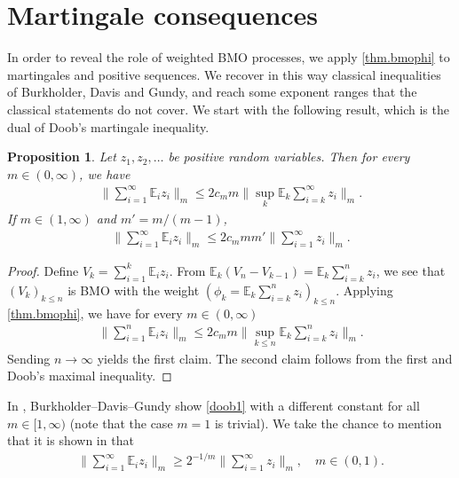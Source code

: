 \documentclass[12pt,oneside,reqno,fleqn]{amsart}
\numberwithin{equation}{section}
\newtheorem{proposition}[theorem]{Proposition}
\theoremstyle{remark}
\newcommand\mE{{\mathbb E}}
\newcommand\E{\mE}
\newcommand{\1}{{\mathbf 1}}
\renewcommand{\le}{\leq}
\renewcommand{\ge}{\geq}
\begin{document}
\section{Martingale consequences} %
\label{sec:inequalities_for_martingales}	
	In order to reveal the role of weighted BMO processes, we apply \cref{thm.bmophi} to martingales and positive sequences.
	We recover in this way classical inequalities of Burkholder, Davis and Gundy, and reach some exponent ranges that the classical statements do not cover.
	We start with the following result, which is the dual of Doob's martingale inequality.
	\begin{proposition}
		Let $z_1,z_2,\ldots$ be positive random variables. Then for every $m\in(0,\infty)$, we have
		\begin{align}\label{doob0}
			\|\sum_{i=1}^\infty\E_{i}z_i\|_m\le 2c_mm\|\sup_{k}\E_k\sum_{i=k}^\infty z_i\|_m.
		\end{align}
		If $m\in(1,\infty)$ and $m'=m/(m-1)$,
		\begin{align}\label{doob1}
			\|\sum_{i=1}^\infty\E_{i}z_i\|_m\le 2c_mmm'\|\sum_{i=1}^\infty z_i\|_m.
		\end{align}
	\end{proposition}
	\begin{proof} 
		Define $V_k=\sum_{i=1}^k\E_{i}z_i$. From $\E_{k}(V_n-V_{k-1})=\E_{k}\sum_{i=k}^nz_i$,
		we see that $(V_k)_{k\le n}$ is BMO with the weight $(\phi_k=\E_k\sum_{i=k}^n z_i)_{k\le n}$. Applying \cref{thm.bmophi}, we have for every $m\in(0,\infty)$
		\begin{align*}
			\|\sum_{i=1}^n\E_{i}z_i\|_m\le 2c_mm\|\sup_{k\le n}\E_k\sum_{i=k}^n z_i\|_m.
		\end{align*}
		Sending $n\to\infty$ yields the first claim. The second claim follows from the first and Doob's maximal inequality.	
	\end{proof}
	In \cite{MR0400380}, Burkholder--Davis--Gundy  show \eqref{doob1}  with a different constant for all $m\in[1,\infty)$ (note that the case $m=1$ is trivial). We take the chance to mention that it is shown in \cite[Theorem 20.1]{MR365692} that
	\begin{align*}
		\|\sum_{i=1}^\infty\E_{i}z_i\|_m\ge 2^{-1/m} \|\sum_{i=1}^\infty z_i\|_m, \quad m\in(0,1).
	\end{align*}
	
\end{document}
